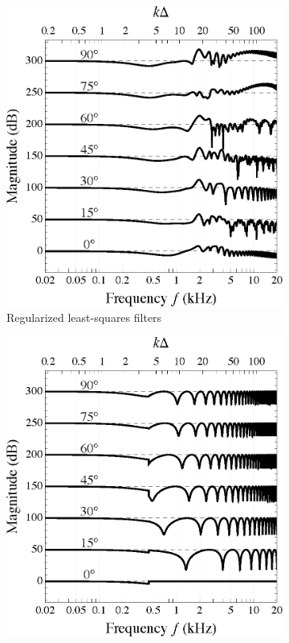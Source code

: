 \begin{figure}[t]
    	\centering
    	\begin{subfigure}[b]{0.49\textwidth}
        		\includegraphics[width=\textwidth]{08_proposed_method/figures/sourceAz_freqResp_pinv.eps}
        		\caption{Regularized least-squares filters}
        		\label{fig:08_Proposed_Method:Azimuth_Dependence:Pinv}
    	\end{subfigure}
	\hfill
    	\begin{subfigure}[b]{0.49\textwidth}
        		\includegraphics[width=\textwidth]{08_proposed_method/figures/sourceAz_freqResp_validhybrid.eps}

\end{subfigure}
\end{figure}
